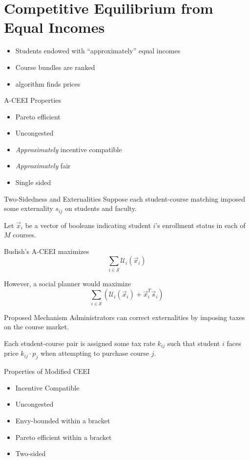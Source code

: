 \documentclass{beamer}
\begin{document}
\section{Competitive Equilibrium from Equal Incomes}
\begin{frame}{\textcite{budish2011}}
\begin{itemize}
    \item Students endowed with ``approximately'' equal incomes
    \item Course bundles are ranked \parencite{budish2016b}
    \item \textcite{othman2010} algorithm finds prices
\end{itemize}
\end{frame}
\begin{frame}{A-CEEI Properties}
\begin{itemize}
    \item Pareto efficient
    \pause
    \item Uncongested
    \pause
    \item \emph{Approximately} incentive compatible
    \pause
    \item \emph{Approximately} fair
    \pause
    \item Single sided
\end{itemize}
\end{frame}
\begin{frame}{Two-Sidedness and Externalities}
Suppose each student-course matching imposed some externality $s_{ij}$ on students and faculty.

Let $\vec{x}_i$ be a vector of booleans indicating student $i$'s enrollment status in each of $M$ courses.
\pause

Budish's A-CEEI maximizes $$\sum_{i \in \mathcal{S}} \mathcal{U}_i(\vec{x}_i)$$
\pause

However, a social planner would maximize $$\sum_{i \in \mathcal{S}}\left( \mathcal{U}_i(\vec{x}_i) + \vec{x}_i^T \vec{s}_i \right)$$
\end{frame}
\begin{frame}{Proposed Mechanism}
Administrators can correct externalities by imposing taxes on the course market.

Each student-course pair is assigned some tax rate $k_{ij}$ such that student $i$ faces price $k_{ij} \cdot p_j$ when attempting to purchase course $j$.
\end{frame}
\begin{frame}{Properties of Modified CEEI}
    \begin{itemize}
        \item Incentive Compatible
        \pause 
        
        \item Uncongested
        \pause 
        \item Envy-bounded within a bracket
        \pause 
        
        \item Pareto efficient within a bracket
        \pause 
        
        \item Two-sided
    \end{itemize}
\end{frame}
\end{document}
